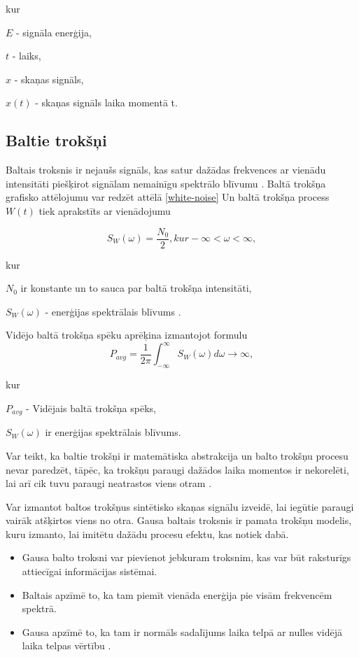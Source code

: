 \documentclass[12pt,paper=A4]{report}
\begin{document}
kur

$E$ - signāla enerģija,

$t$ - laiks,

$x$ - skaņas signāls,

$x(t)$ - skaņas signāls laika momentā t.


\subsection{Baltie trokšņi}
Baltais troksnis ir nejaušs signāls, kas satur dažādas frekvences ar vienādu intensitāti piešķirot signālam nemainīgu spektrālo blīvumu \cite{wiki}. 
Baltā trokšņa grafisko attēlojumu var redzēt attēlā \ref{white-noise} Un baltā trokšņa process ${W(t)}$ tiek aprakstīts ar vienādojumu

\begin{equation}
S_W(\omega)=\frac{N_0}{2}, kur
 -\infty < \omega < \infty ,
\end{equation}

kur 

$N_0$ ir konstante un to sauca par baltā trokšņa intensitāti,

$S_W(\omega)$ - enerģijas spektrālais blīvums \cite{dtw46}. 



Vidējo baltā trokšņa spēku aprēķina izmantojot formulu 
\begin{equation}
P_{avg} =\frac{1}{2 \pi } \int^{\infty}_{ -\infty } S_W(\omega) d \omega \rightarrow \infty ,
\end{equation}

kur 

$P_{avg}$ - Vidējais baltā trokšņa spēks,

$S_W(\omega)$ ir enerģijas spektrālais blīvums.



Var teikt, ka baltie trokšņi ir matemātiska abstrakcija un balto trokšņu procesu nevar paredzēt, tāpēc, ka trokšņu paraugi dažādos laika momentos ir nekorelēti, lai arī cik tuvu paraugi neatrastos viens otram \cite{WhiteNoise}. 

Var izmantot baltos trokšņus sintētisko skaņas signālu izveidē, lai iegūtie paraugi vairāk atšķirtos viens no otra. Gausa baltais troksnis ir pamata trokšņu modelis, kuru izmanto, lai imitētu dažādu procesu efektu, kas notiek dabā.
\begin{itemize}

\item Gausa balto troksni var pievienot jebkuram troksnim, kas var būt raksturīgs attiecīgai informācijas sistēmai. 
\item Baltais apzīmē to, ka tam piemīt vienāda enerģija pie visām frekvencēm spektrā. 
\item Gausa apzīmē to, ka tam ir normāls sadalījums laika telpā ar nulles vidējā laika telpas vērtību \cite{wiki}
\cite{http://www.nosleeplessnights.com/what-is-white-noise-whats-all-the-fuss-about/}. 
\end{itemize} 
\end{document}
